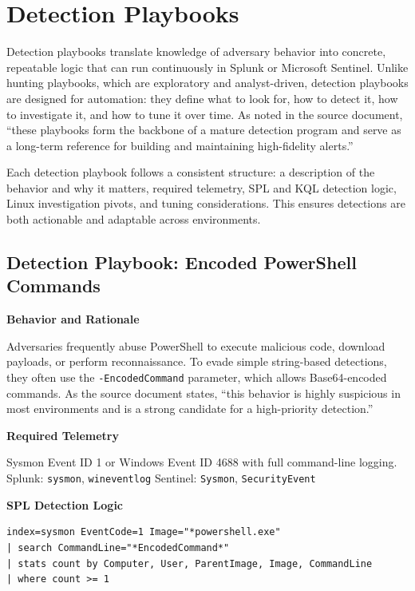 \section{Detection Playbooks}

Detection playbooks translate knowledge of adversary behavior into concrete, repeatable logic that can run continuously 
in Splunk or Microsoft Sentinel. Unlike hunting playbooks, which are exploratory and analyst-driven, detection playbooks 
are designed for automation: they define what to look for, how to detect it, how to investigate it, and how to tune it 
over time. As noted in the source document, “these playbooks form the backbone of a mature detection program and serve 
as a long-term reference for building and maintaining high-fidelity alerts.” 

Each detection playbook follows a consistent structure: a description of the behavior and why it matters, required telemetry, 
SPL and KQL detection logic, Linux investigation pivots, and tuning considerations. This ensures detections are both 
actionable and adaptable across environments.


\subsection*{Detection Playbook: Encoded PowerShell Commands}

\textbf{Behavior and Rationale}

Adversaries frequently abuse PowerShell to execute malicious code, download payloads, or perform reconnaissance. 
To evade simple string-based detections, they often use the \texttt{-EncodedCommand} parameter, which allows Base64-encoded 
commands. As the source document states, “this behavior is highly suspicious in most environments and is a strong candidate 
for a high-priority detection.” 

\textbf{Required Telemetry}

Sysmon Event ID 1 or Windows Event ID 4688 with full command-line logging.  
Splunk: \texttt{sysmon}, \texttt{wineventlog}  
Sentinel: \texttt{Sysmon}, \texttt{SecurityEvent}

\textbf{SPL Detection Logic}

\begin{lstlisting}
index=sysmon EventCode=1 Image="*powershell.exe"
| search CommandLine="*EncodedCommand*"
| stats count by Computer, User, ParentImage, Image, CommandLine
| where count >= 1
\end{lstlisting}

